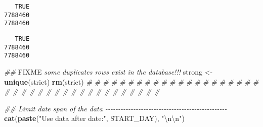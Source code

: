 \documentclass[
  10pt,
  a4paper,oneside]{article}
\newenvironment{Shaded}{\begin{snugshade}}{\end{snugshade}}
\newcommand{\AlertTok}[1]{\textcolor[rgb]{0.94,0.16,0.16}{#1}}
\newcommand{\CharTok}[1]{\textcolor[rgb]{0.31,0.60,0.02}{#1}}
\newcommand{\CommentTok}[1]{\textcolor[rgb]{0.56,0.35,0.01}{\textit{#1}}}
\newcommand{\DecValTok}[1]{\textcolor[rgb]{0.00,0.00,0.81}{#1}}
\newcommand{\KeywordTok}[1]{\textcolor[rgb]{0.13,0.29,0.53}{\textbf{#1}}}
\newcommand{\NormalTok}[1]{#1}
\newcommand{\OperatorTok}[1]{\textcolor[rgb]{0.81,0.36,0.00}{\textbf{#1}}}
\newcommand{\OtherTok}[1]{\textcolor[rgb]{0.56,0.35,0.01}{#1}}
\newcommand{\StringTok}[1]{\textcolor[rgb]{0.31,0.60,0.02}{#1}}
\begin{document}
\begin{Shaded}
\end{Shaded}

\begin{verbatim}
   TRUE 
7788460 
7788460
\end{verbatim}

\begin{Shaded}
\end{Shaded}

\begin{verbatim}
   TRUE 
7788460 
7788460
\end{verbatim}

\begin{Shaded}
\begin{Highlighting}[]
\CommentTok{\#\# }\AlertTok{FIXME}\CommentTok{ some duplicates rows exist in the database!!!}
\NormalTok{strong \textless{}{-}}\StringTok{ }\KeywordTok{unique}\NormalTok{(strict)}
\KeywordTok{rm}\NormalTok{(strict)}
\CommentTok{\# \# \# \# \# \# \# \# \# \# \# \# \# \# \# \# \# \# \# \# \# \# \# \# \# \# \# \# \# \# \# \# \# \# \# \# \# \# \# \#}



\CommentTok{\#\#  Limit date span of the data {-}{-}{-}{-}{-}{-}{-}{-}{-}{-}{-}{-}{-}{-}{-}{-}{-}{-}{-}{-}{-}{-}{-}{-}{-}{-}{-}{-}{-}{-}{-}{-}{-}{-}{-}{-}{-}{-}{-}{-}{-}{-}{-}{-}{-}{-}{-}{-}}
\KeywordTok{cat}\NormalTok{(}\KeywordTok{paste}\NormalTok{(}\StringTok{"Use data after date:"}\NormalTok{, START\_DAY), }\StringTok{"}\CharTok{\textbackslash{}n\textbackslash{}n}\StringTok{"}\NormalTok{)}
\end{Highlighting}
\end{Shaded}
\end{document}
